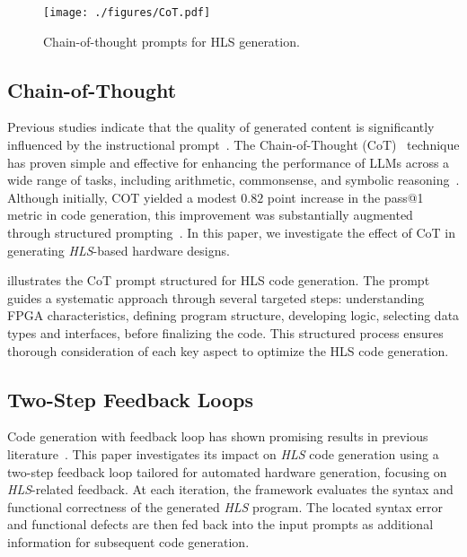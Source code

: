 \begin{figure}[t]
\centering
\texttt{[image: ./figures/CoT.pdf]}
\vspace{-3mm}
\caption{Chain-of-thought prompts for HLS generation.}
\vspace{-3mm}
\label{fig:cot}
\end{figure}


\subsection{Chain-of-Thought}\label{subsec:hwgen_cot}
Previous studies indicate that the quality of generated content is significantly influenced by the instructional prompt~\cite{zhao2021calibrate}.
The Chain-of-Thought (CoT)~\cite{wei2022chain} technique has proven simple and effective for enhancing the performance of LLMs across a wide range of tasks, including arithmetic, commonsense, and symbolic reasoning~\cite{wei2022chain}.
Although initially, COT yielded a modest $0.82$ point increase in the pass@1 metric in code generation,  this improvement was substantially augmented through structured prompting~\cite{li2023structured}.
In this paper, we investigate the effect of CoT in generating \textit{HLS}-based hardware designs. 

 illustrates the CoT prompt structured for HLS code generation. The prompt guides a systematic approach through several targeted steps:  understanding FPGA characteristics, defining program structure, developing logic,  selecting data types and interfaces, before finalizing the code. This structured process ensures thorough consideration of each key aspect to optimize the HLS code generation.

\subsection{Two-Step Feedback Loops}\label{subsec:hwgen_loop}

Code generation with feedback loop has shown promising results in previous literature~\cite{liu2023rltf, shojaee2023execution, wang2022compilable, llm-verippa}.
This paper investigates its impact on \textit{HLS} code generation using a two-step feedback loop tailored for automated hardware generation, focusing on \textit{HLS}-related feedback.
At each iteration, the framework evaluates the syntax and functional correctness of the generated \textit{HLS} program. 
The located syntax error and functional defects are then fed back into the input prompts as additional information for subsequent code generation.

